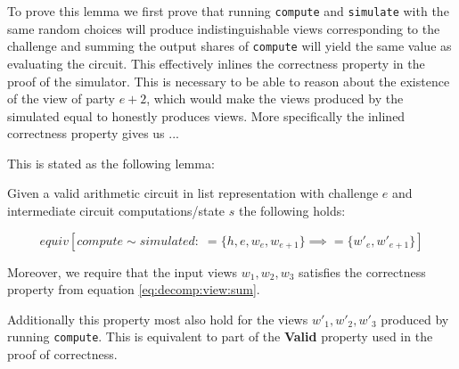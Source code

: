 To prove this lemma we first prove that running \texttt{compute} and
\texttt{simulate} with the same random choices will produce indistinguishable
views corresponding to the challenge and summing the output shares of
\texttt{compute} will yield the same value as evaluating the circuit. This
effectively inlines the correctness property in the proof of the simulator. This
is necessary to be able to reason about the existence of the view of party
$e+2$, which would make the views produced by the simulated equal to honestly
produces views.
More specifically the inlined correctness property gives us ...

This is stated as the following lemma:


\begin{lemma}
  \label{lem:zkboo:decomposition:privacy_aux}
  Given a valid arithmetic circuit in list representation with challenge $e$ and
  intermediate circuit computations/state $s$ the following holds:

  \[
    equiv[compute \sim simulated : \; =\!\{h, e, w_{e}, w_{e+1}\} \implies =\!\{w'_{e}, w'_{e+1}\}]
  \]

  Moreover, we require that the input views $w_{1}, w_{2}, w_{3}$ satisfies the
  correctness property from equation \ref{eq:decomp:view:sum}.

  Additionally this property most also hold for the views
  $w'_{1}, w'_{2}, w'_{3}$ produced by running \texttt{compute}. This is
  equivalent to part of the \textbf{Valid} property used in the proof of
  correctness.

\end{lemma}
